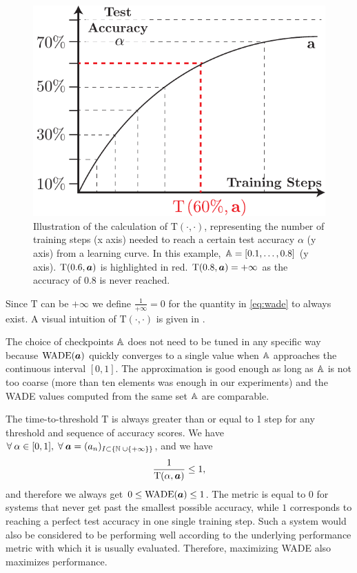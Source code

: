 \begin{figure}[htbp]
  \centering
 \includegraphics[width=.4\linewidth]{figures/metric_tto}
 \caption{Illustration of the calculation of $\text{T}(\cdot, \cdot)$,
   representing the number of training steps (x axis) needed to reach a certain test
   accuracy $\alpha$ (y axis) from a learning curve. In this example,
   ${\mathbb{A}} = [0.1, \ldots, 0.8]$ (y axis). $\text{T}(0.6, {\bm{a}})$ is highlighted in red.
   $\text{T}(0.8, {\bm{a}}) = +\infty$ as the accuracy of 0.8 is never reached.}
  \label{fig:metric_tto}

\end{figure}


Since $\text{T}$ can be $+\infty$ we define
$\frac{1}{+\infty} = 0$ for the quantity in \eqref{eq:wade} to always exist. A visual
intuition of $\text{T}(\cdot, \cdot)$ is given in .


The choice of checkpoints ${\mathbb{A}}$ does not need to be tuned in any specific way
because $\text{WADE}({\bm{a}})$ quickly converges to a single value when ${\mathbb{A}}$
approaches the continuous interval $[0, 1]$. The approximation is good enough as
long as ${\mathbb{A}}$ is not too coarse (more than ten elements was enough in our
experiments) and the WADE values computed from the same set ${\mathbb{A}}$ are
comparable.

The time-to-threshold $\text{T}$ is always greater than or equal to 1 step for any threshold and sequence of accuracy scores.
We have
$\forall\: \alpha \in [0, 1],\;  \forall\: {\bm{a}} = ({a}_{n})_{I \subset \{\mathbb{N}\; \cup \{+\infty\} \}}$, and we have
\begin{equation}
  \label{eq:wade-0-1}
\frac{1}{\text{T}(\alpha, {\bm{a}})} \leq 1,
\end{equation}
and therefore we always get $0 \leq \text{WADE}({\bm{a}}) \leq 1$. The metric is equal to $0$
for systems that never get past the smallest possible accuracy, while $1$
corresponds to reaching a perfect test accuracy in one single training step. Such
a system would also be considered to be performing well according to the
underlying performance metric with which it is usually evaluated. Therefore,
maximizing WADE also maximizes performance.


